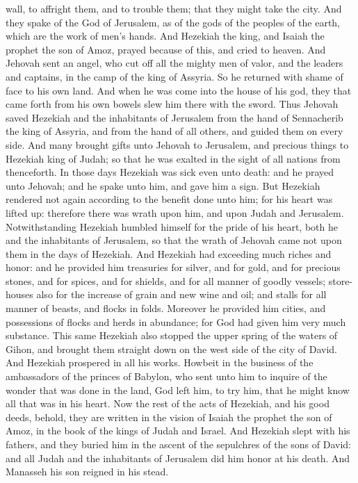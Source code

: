 wall, to affright them, and to trouble them; that they might take the city. And they spake of the God of Jerusalem, as of the gods of the peoples of the earth, which are the work of men’s hands.  And Hezekiah the king, and Isaiah the prophet the son of Amoz, prayed because of this, and cried to heaven. And Jehovah sent an angel, who cut off all the mighty men of valor, and the leaders and captains, in the camp of the king of Assyria. So he returned with shame of face to his own land. And when he was come into the house of his god, they that came forth from his own bowels slew him there with the sword. Thus Jehovah saved Hezekiah and the inhabitants of Jerusalem from the hand of Sennacherib the king of Assyria, and from the hand of all others, and guided them on every side. And many brought gifts unto Jehovah to Jerusalem, and precious things to Hezekiah king of Judah; so that he was exalted in the sight of all nations from thenceforth.  In those days Hezekiah was sick even unto death: and he prayed unto Jehovah; and he spake unto him, and gave him a sign. But Hezekiah rendered not again according to the benefit done unto him; for his heart was lifted up: therefore there was wrath upon him, and upon Judah and Jerusalem. Notwithstanding Hezekiah humbled himself for the pride of his heart, both he and the inhabitants of Jerusalem, so that the wrath of Jehovah came not upon them in the days of Hezekiah.  And Hezekiah had exceeding much riches and honor: and he provided him treasuries for silver, and for gold, and for precious stones, and for spices, and for shields, and for all manner of goodly vessels; store-houses also for the increase of grain and new wine and oil; and stalls for all manner of beasts, and flocks in folds. Moreover he provided him cities, and possessions of flocks and herds in abundance; for God had given him very much substance. This same Hezekiah also stopped the upper spring of the waters of Gihon, and brought them straight down on the west side of the city of David. And Hezekiah prospered in all his works. Howbeit in the business of the ambassadors of the princes of Babylon, who sent unto him to inquire of the wonder that was done in the land, God left him, to try him, that he might know all that was in his heart.  Now the rest of the acts of Hezekiah, and his good deeds, behold, they are written in the vision of Isaiah the prophet the son of Amoz, in the book of the kings of Judah and Israel. And Hezekiah slept with his fathers, and they buried him in the ascent of the sepulchres of the sons of David: and all Judah and the inhabitants of Jerusalem did him honor at his death. And Manasseh his son reigned in his stead. 

